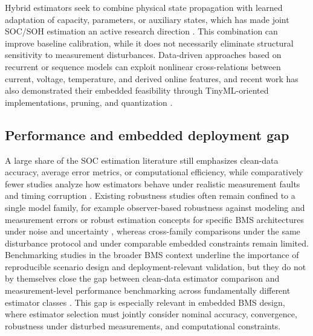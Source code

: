 \documentclass[review,nopreprintline]{elsarticle}
\begin{document}
Hybrid estimators seek to combine physical state propagation with learned adaptation of capacity, parameters, or auxiliary states, which has made joint SOC/SOH estimation an active research direction \cite{gaoCoEstimationStateofChargeStateof2022,shenAlternativeCombinedCoestimation2022,wangFusionEstimationLithiumion2022}. This combination can improve baseline calibration, while it does not necessarily eliminate structural sensitivity to measurement disturbances. Data-driven approaches based on recurrent or sequence models can exploit nonlinear cross-relations between current, voltage, temperature, and derived online features, and recent work has also demonstrated their embedded feasibility through TinyML-oriented implementations, pruning, and quantization \cite{mondalEstimatingStateofChargeLithiumIon2024,Embedded_AI_only_SOC_mobile,giazitzisCaseStudyTiny2024,mazziStateChargeEstimation2022,yaoSmarterBatteryManagement2025b}.

\subsection{Performance and embedded deployment gap}
A large share of the SOC estimation literature still emphasizes clean-data accuracy, average error metrics, or computational efficiency, while comparatively fewer studies analyze how estimators behave under realistic measurement faults and timing corruption \cite{shrivastavaReviewTechnologicalAdvancement2023,Embedded_AI_only_SOC_mobile,giazitzisCaseStudyTiny2024,mazziStateChargeEstimation2022}. Existing robustness studies often remain confined to a single model family, for example observer-based robustness against modeling and measurement errors \cite{liRobustnessSOCEstimation2015} or robust estimation concepts for specific BMS architectures under noise and uncertainty \cite{naseriReliableWirelessBMS2025}, whereas cross-family comparisons under the same disturbance protocol and under comparable embedded constraints remain limited. Benchmarking studies in the broader BMS context underline the importance of reproducible scenario design and deployment-relevant validation, but they do not by themselves close the gap between clean-data estimator comparison and measurement-level performance benchmarking across fundamentally different estimator classes \cite{bergerBenchmarkingBatteryManagement2024}. This gap is especially relevant in embedded BMS design, where estimator selection must jointly consider nominal accuracy, convergence, robustness under disturbed measurements, and computational constraints.
\end{document}
